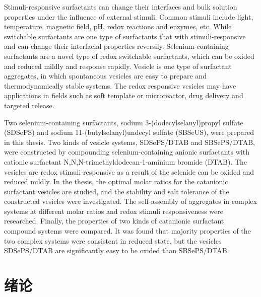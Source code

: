 \documentclass[bachelor,winfonts,replaceperiod]{jnuthesis}
\begin{document}
    \begin{englishabstract}
        Stimuli-responsive surfactants can change their interfaces and bulk solution properties under the influence of external stimuli.
        Common stimuli include light, temperature, magnetic field, pH, redox reactions and enzymes, etc. While switchable surfactants
        are one type of surfactants that with stimuli-responsive and can change their interfacial properties reversily. Selenium-containing surfactants are a novel type of redox switchable surfactants, which can be oxided and reduced mildly and response rapidly. 
        Vesicle is  one type of surfactant aggregates,  in which spontaneous vesicles are easy to prepare and thermodynamically stable
        systems. The redox responsive vesicles may have applications in fields such as soft template or microreactor, drug delivery
        and targeted release.
        
        Two selenium-containing surfactants, sodium 3-(dodecylselanyl)propyl sulfate (SDSePS) and sodium 
        11-(butylselanyl)undecyl sulfate (SBSeUS), were prepared in this thesis. Two kinds of vesicle systems, SDSePS/DTAB and
        SBSePS/DTAB, were constructed by compounding selenium-containing anionic surfactants with cationic surfactant N,N,N-trimethyldodecan-1-aminium bromide (DTAB). The vesicles are redox
        stimuli-responsive as a result of the selenide can be oxided and reduced mildly. In the thesis, the optimal molar ratios for the 
        catanionic surfactant vesicles are studied, and the stability and salt tolerance of the constructed vesicles were investigated.
        The self-assembly of aggregates in complex systems at different molar ratios and  redox stimuli responsiveness were researched. 
        Finally, the properties of two kinds of catanionic surfactant compound systems were compared. It was found that majority properties
        of the two complex systems were consistent in reduced state, but the vesicles SDSePS/DTAB are significantly easy  to be oxided than SBSePS/DTAB.
    \end{englishabstract}
    
    \tableofcontents
    
    \mainmatter
    
    \chapter{绪论}\label{chapter:introduction}
\end{document}
